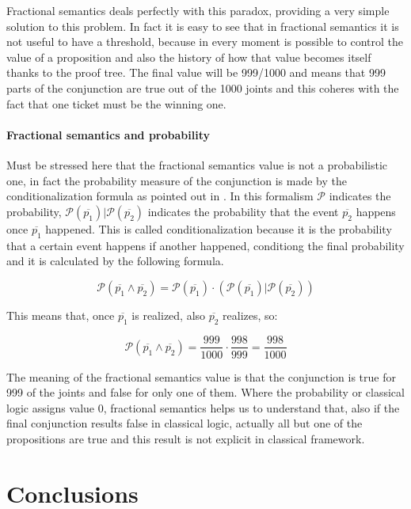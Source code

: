 \documentclass[a4paper, 12pt, oneside]{article}
\theoremstyle{plain}
\theoremstyle{definition}
\begin{document}
Fractional semantics deals perfectly with this paradox, providing a very simple solution to this problem. In fact it is easy to see that in fractional semantics it is not useful to have a threshold, because in every moment is possible to control the value of a proposition and also the history of how that value becomes itself thanks to the proof tree. 
The final value will be 999/1000 and means that 999 parts of the conjunction are true out of the 1000 joints and this coheres with the fact that one ticket must be the winning one.  

\paragraph{Fractional semantics and probability}
Must be stressed here that the fractional semantics value is not a probabilistic one, in fact the probability measure of the conjunction is made by the conditionalization formula as pointed out in \cite{halpern:reasoning}. In this formalism $\mathcal{P}$ indicates the probability,  $\mathcal{P}(\overline{p_1})|\mathcal{P}(\overline{p_2})$ indicates the probability that the event $\overline{p_2}$  happens once $\overline{p_1}$ happened. This is called conditionalization because it is the probability that a certain event happens if another happened, conditiong the final probability and it is calculated by the following formula.


$$\mathcal{P}(\overline{p_1} \wedge \overline{p_2}) = \mathcal{P} (\overline{p_1})\cdot (\mathcal{P} (\overline{p_1})|\mathcal{P}(\overline{p_2}))$$

\noindent
This means that, once $\overline{p_1}$ is realized, also $\overline{p_2}$ realizes, so:

$$\mathcal{P}(\overline{p_1} \wedge \overline{p_2}) = \frac{999}{1000} 	\cdot \frac{998}{999} = \frac{998}{1000}$$


The meaning of the fractional semantics value is that the conjunction is true for 999 of the joints and false for only one of them. Where the probability or classical logic assigns value 0, fractional semantics helps us to understand that, also if the final conjunction results false in classical logic, actually all but one of the propositions are true and this result is not explicit in classical framework.


\section{Conclusions}
\end{document}
